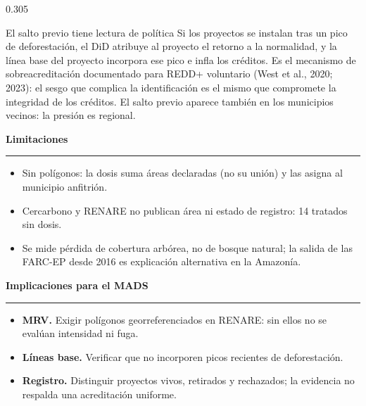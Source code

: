 \documentclass[final,t]{beamer}
\newcommand{\seccion}[2]{%
  \par\vspace{0.5\baselineskip}%
  {\color{dosel}\Large\bfseries #1\hfill{\color{tenue}\normalsize\mdseries #2}}\par
  \vspace{-0.35\baselineskip}%
  {\color{dosel}\rule{\linewidth}{2.2pt}}\par
  \vspace{0.25\baselineskip}%
}
\begin{document}
\begin{frame}[t]{}
\begin{columns}[t]
\begin{column}{0.305\paperwidth}
\begin{caja}[orofondo]{El salto previo tiene lectura de política}
Si los proyectos se instalan tras un pico de deforestación, el DiD atribuye al proyecto el retorno
a la normalidad, y la línea base del proyecto incorpora ese pico e infla los créditos. Es el
mecanismo de sobreacreditación documentado para REDD+ voluntario (West et al., 2020; 2023): el
sesgo que complica la identificación es el mismo que compromete la integridad de los créditos.
El salto previo aparece también en los municipios vecinos: la presión es regional.
\end{caja}

\seccion{Limitaciones}{}
\begin{itemize}
  \item[\textcolor{brasa}{\rule{0.45ex}{0.45ex}}] Sin polígonos: la dosis suma áreas declaradas
        (no su unión) y las asigna al municipio anfitrión.
  \item[\textcolor{brasa}{\rule{0.45ex}{0.45ex}}] Cercarbono y RENARE no publican área ni estado de
        registro: 14 tratados sin dosis.
  \item[\textcolor{brasa}{\rule{0.45ex}{0.45ex}}] Se mide pérdida de cobertura arbórea, no de bosque
        natural; la salida de las FARC-EP desde 2016 es explicación alternativa en la Amazonía.
\end{itemize}

\seccion{Implicaciones para el MADS}{}
\begin{caja}[politicafondo]{}
\begin{itemize}
  \item \textbf{MRV.} Exigir polígonos georreferenciados en RENARE: sin ellos no se evalúan
        intensidad ni fuga.
  \item \textbf{Líneas base.} Verificar que no incorporen picos recientes de deforestación.
  \item \textbf{Registro.} Distinguir proyectos vivos, retirados y rechazados; la evidencia no
        respalda una acreditación uniforme.
\end{itemize}
\end{caja}

\end{column}
\end{columns}

\vfill


\end{frame}
\end{document}
